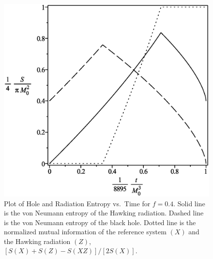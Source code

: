 \documentclass[12pt]{article}
\begin{document}
\begin{figure}[H]
\centering
\includegraphics[width=1\textwidth]{Hawking-hole-radiation-mutual-entropy-vs-time-graph-10f-is-4.eps}
\caption{Plot of Hole and Radiation Entropy vs.\ Time for $f=0.4$.
Solid line is the von Neumann entropy of the Hawking radiation.
Dashed line is the von Neumann entropy of the black hole.
Dotted line is the normalized mutual information of the reference system $(X)$ and the Hawking radiation $(Z)$, $[S(X)+S(Z)-S(XZ)]/[2S(X)]$.}
\end{figure}
\end{document}
